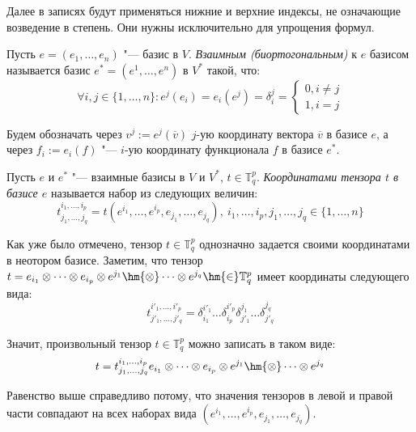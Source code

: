 \begin{note}
    Далее в записях будут применяться нижние и верхние индексы, не означающие возведение в степень. Они нужны исключительно для упрощения формул.
\end{note}

\begin{definition}
    Пусть $e = (e_1, \dots, e_n)$ "--- базис в $V$. \textit{Взаимным (биортогональным)} к $e$ базисом называется базис $e^* = (e^1, \dots, e^n)$ в $V^*$ такой, что:
    \[\forall i, j \in \{1, \dotsc, n\}: e^j(e_i) = e_i(e^j) = \delta^j_i = \left\{\begin{aligned}
    0, i \ne j\\
    1, i = j
    \end{aligned}\right.\]
    
    Будем обозначать через $v^j := e^j(\overline{v})$ $j$-ую координату вектора $\overline{v}$ в базисе $e$, а через $f_i := e_i(f)$ "--- $i$-ую координату функционала $f$ в базисе $e^*$.
\end{definition}

\begin{definition}
    Пусть $e$ и $e^*$ "--- взаимные базисы в $V$ и $V^*$, $t \in \mathbb{T}^p_q$. \textit{Координатами тензора $t$ в базисе $e$} называется набор из следующих величин:
    \[t^{i_1, \dots, i_p}_{j_1, \dots, j_q} = t(e^{i_1}, \dots, e^{i_p}, e_{j_1}, \dots, e_{j_q}),~i_1, \dots, i_p, j_1, \dots, j_q \in \{1, \dots, n\}\]
\end{definition}

\begin{note}
    Как уже было отмечено, тензор $t \in \mathbb T^p_q$ однозначно задается своими координатами в неотором базисе. Заметим, что тензор $t = e_{i_1} \otimes \dots \otimes e_{i_p} \otimes e^{j_1} \hm{\otimes} \dots \otimes e^{j_q} \hm{\in} \mathbb{T}^p_q$ имеет координаты следующего вида:
    \[t^{i'_1, \dots, i'_p}_{j'_1, \dots, j'_q} = \delta_{i_1}^{i'_1}\dots\delta_{i_p}^{i'_p}\delta_{j'_1}^{j_1}\dots\delta_{j'_q}^{j_q}\]
    
    Значит, произвольный тензор $t \in \mathbb{T}^p_q$ можно записать в таком виде:
    \[t = t^{i_1, \dots, i_p}_{j_1, \dots, j_q}e_{i_1} \otimes \dots \otimes e_{i_p} \otimes e^{j_1} \hm{\otimes} \dots \otimes e^{j_q}\]
    
    Равенство выше справедливо потому, что значения тензоров в левой и правой части совпадают на всех наборах вида $(e^{i_1}, \dots, e^{i_p}, e_{j_1}, \dots, e_{j_q})$.
\end{note}
    
